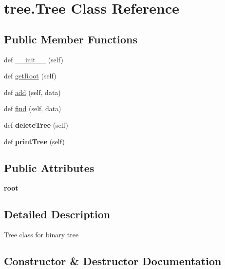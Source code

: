 \hypertarget{classtree_1_1Tree}{}\section{tree.\+Tree Class Reference}
\label{classtree_1_1Tree}
\subsection*{Public Member Functions}
\begin{DoxyCompactItemize}
\item 
def \hyperlink{classtree_1_1Tree_ae6766dbfd5f24b1beeb492ea86d48eda}{\+\_\+\+\_\+init\+\_\+\+\_\+} (self)
\item 
def \hyperlink{classtree_1_1Tree_aeafbc59fabeae3758a3298f167bdf5af}{get\+Root} (self)
\item 
def \hyperlink{classtree_1_1Tree_ac86834d17766cabcf9932921e78f402b}{add} (self, data)
\item 
def \hyperlink{classtree_1_1Tree_a1ab25ba4724a490f0e93c12801ab32d2}{find} (self, data)
\item 
\mbox{\label{classtree_1_1Tree_a1537147bce0c8fba10d7512630325d25}} 
def {\bfseries delete\+Tree} (self)
\item 
\mbox{\label{classtree_1_1Tree_af94602a0b7744b7094c63bae887b89f9}} 
def {\bfseries print\+Tree} (self)
\end{DoxyCompactItemize}
\subsection*{Public Attributes}
\begin{DoxyCompactItemize}
\item 
\mbox{\label{classtree_1_1Tree_af113725032a5affae34a81564874dca5}} 
{\bfseries root}
\end{DoxyCompactItemize}


\subsection{Detailed Description}
\begin{DoxyVerb}Tree class for binary tree \end{DoxyVerb}
 

\subsection{Constructor \& Destructor Documentation}
\mbox{\label{classtree_1_1Tree_ae6766dbfd5f24b1beeb492ea86d48eda}} 
